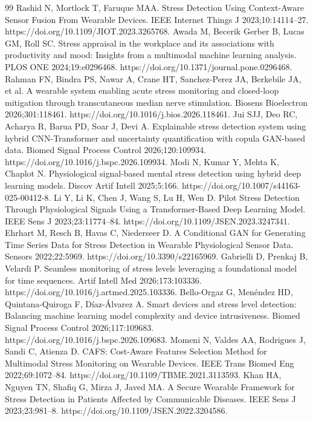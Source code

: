 \documentclass[11pt,a4paper]{article}
\begin{document}
\begin{thebibliography}{99}
 Rashid N, Mortlock T, Faruque MAA. Stress Detection Using Context-Aware Sensor Fusion From Wearable Devices. IEEE Internet Things J 2023;10:14114--27. https://doi.org/10.1109/JIOT.2023.3265768.
 Awada M, Becerik Gerber B, Lucas GM, Roll SC. Stress appraisal in the workplace and its associations with productivity and mood: Insights from a multimodal machine learning analysis. PLOS ONE 2024;19:e0296468. https://doi.org/10.1371/journal.pone.0296468.
 Rahman FN, Bindra PS, Nawar A, Crane HT, Sanchez-Perez JA, Berkebile JA, et al. A wearable system enabling acute stress monitoring and closed-loop mitigation through transcutaneous median nerve stimulation. Biosens Bioelectron 2026;301:118461. https://doi.org/10.1016/j.bios.2026.118461.
 Jui SJJ, Deo RC, Acharya R, Barua PD, Soar J, Devi A. Explainable stress detection system using hybrid CNN-Transformer and uncertainty quantification with copula GAN-based data. Biomed Signal Process Control 2026;120:109934. https://doi.org/10.1016/j.bspc.2026.109934.
 Modi N, Kumar Y, Mehta K, Chaplot N. Physiological signal-based mental stress detection using hybrid deep learning models. Discov Artif Intell 2025;5:166. https://doi.org/10.1007/s44163-025-00412-8.
 Li Y, Li K, Chen J, Wang S, Lu H, Wen D. Pilot Stress Detection Through Physiological Signals Using a Transformer-Based Deep Learning Model. IEEE Sens J 2023;23:11774--84. https://doi.org/10.1109/JSEN.2023.3247341.
 Ehrhart M, Resch B, Havas C, Niederseer D. A Conditional GAN for Generating Time Series Data for Stress Detection in Wearable Physiological Sensor Data. Sensors 2022;22:5969. https://doi.org/10.3390/s22165969.
 Gabrielli D, Prenkaj B, Velardi P. Seamless monitoring of stress levels leveraging a foundational model for time sequences. Artif Intell Med 2026;173:103336. https://doi.org/10.1016/j.artmed.2025.103336.
 Bello-Orgaz G, Menéndez HD, Quintana-Quiroga F, Díaz-Álvarez A. Smart devices and stress level detection: Balancing machine learning model complexity and device intrusiveness. Biomed Signal Process Control 2026;117:109683. https://doi.org/10.1016/j.bspc.2026.109683.
 Momeni N, Valdes AA, Rodrigues J, Sandi C, Atienza D. CAFS: Cost-Aware Features Selection Method for Multimodal Stress Monitoring on Wearable Devices. IEEE Trans Biomed Eng 2022;69:1072--84. https://doi.org/10.1109/TBME.2021.3113593.
 Khan HA, Nguyen TN, Shafiq G, Mirza J, Javed MA. A Secure Wearable Framework for Stress Detection in Patients Affected by Communicable Diseases. IEEE Sens J 2023;23:981--8. https://doi.org/10.1109/JSEN.2022.3204586.

\end{thebibliography}
\end{document}
